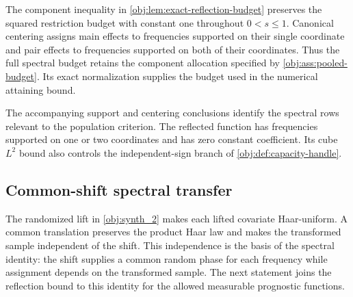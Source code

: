\documentclass[11pt]{article}
\begin{document}
The component inequality in \cref{obj:lem:exact-reflection-budget} preserves the squared restriction budget with constant one throughout \(0<s\leq1\). Canonical centering assigns main effects to frequencies supported on their single coordinate and pair effects to frequencies supported on both of their coordinates. Thus the full spectral budget retains the component allocation specified by \cref{obj:ass:pooled-budget}. Its exact normalization supplies the budget used in the numerical attaining bound.

The accompanying support and centering conclusions identify the spectral rows relevant to the population criterion. The reflected function has frequencies supported on one or two coordinates and has zero constant coefficient. Its cube \(L^2\) bound also controls the independent-sign branch of \cref{obj:def:capacity-handle}.

\subsection{Common-shift spectral transfer}

The randomized lift in \cref{obj:synth_2} makes each lifted covariate Haar-uniform. A common translation preserves the product Haar law and makes the transformed sample independent of the shift. This independence is the basis of the spectral identity: the shift supplies a common random phase for each frequency while assignment depends on the transformed sample. The next statement joins the reflection bound to this identity for the allowed measurable prognostic functions.
\end{document}
